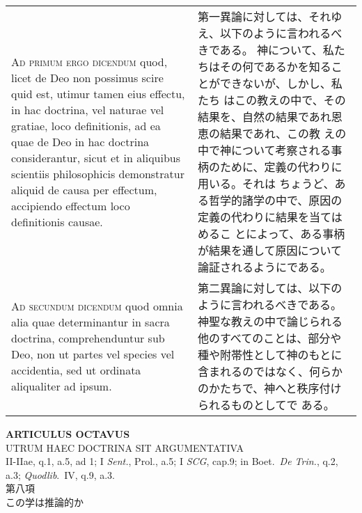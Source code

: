 \documentclass[10pt]{jsarticle} %
\begin{document}
\begin{longtable}{p{21em}p{21em}}
\\


{\scshape Ad primum ergo dicendum} quod, licet de Deo non
possimus scire quid est, utimur tamen eius effectu, in hac doctrina, vel
naturae vel gratiae, loco definitionis, ad ea quae de Deo in hac
doctrina considerantur, sicut et in aliquibus scientiis philosophicis
demonstratur aliquid de causa per effectum, accipiendo effectum loco
definitionis causae.


&

第一異論に対しては、それゆえ、以下のように言われるべきである。
神について、私たちはその何であるかを知ることができないが、しかし、私たち
 はこの教えの中で、その結果を、自然の結果であれ恩恵の結果であれ、この教
 えの中で神について考察される事柄のために、定義の代わりに用いる。それは
 ちょうど、ある哲学的諸学の中で、原因の定義の代わりに結果を当てはめるこ
 とによって、ある事柄が結果を通して原因について論証されるようにである。


\\


{\scshape Ad secundum dicendum} quod omnia alia quae
determinantur in sacra doctrina, comprehenduntur sub Deo, non ut partes
vel species vel accidentia, sed ut ordinata aliqualiter ad ipsum.


&

第二異論に対しては、以下のように言われるべきである。
神聖な教えの中で論じられる他のすべてのことは、部分や種や附帯性として神のもとに
 含まれるのではなく、何らかのかたちで、神へと秩序付けられるものとしてで
 ある。


\end{longtable}
\newpage




\begin{center}
 {\Large {\bf ARTICULUS OCTAVUS}}\\
 {\large UTRUM HAEC DOCTRINA SIT ARGUMENTATIVA}\\
 {\footnotesize II-IIae, q.1, a.5, ad 1; I {\itshape Sent.}, Prol., a.5;
 I {\itshape SCG}, cap.9; in Boet.~{\itshape De Trin.}, q.2, a.3;
 {\itshape Quodlib}.~IV, q.9, a.3.}\\
 {\Large 第八項\\この学は推論的か}
\end{center}
\end{document}
